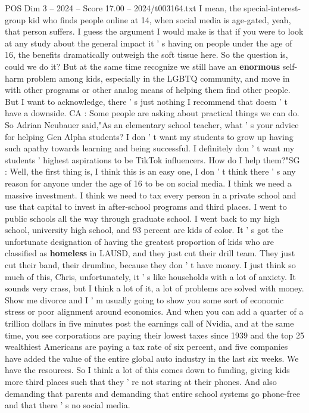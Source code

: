 \begin{textsample}{POS Dim 3 – 2024 – Score 17.00 – 2024/t003164.txt}
I mean, the special-interest-group kid who finds people online at 14, when social media is age-gated, yeah, that person suffers.
I guess the argument I would make is that if you were to look at any study about the general impact it ' s having on people under the age of 16, the benefits dramatically outweigh the soft tissue here.
So the question is, could we do it?
But at the same time recognize we still have an \textbf{enormous} self-harm problem among kids, especially in the LGBTQ community, and move in with other programs or other analog means of helping them find other people.
But I want to acknowledge, there ' s just nothing I recommend that doesn ' t have a downside.
CA : Some people are asking about practical things we can do.
So Adrian Neubauer said,"As an elementary school teacher, what ' s your advice for helping Gen Alpha students?
I don ' t want my students to grow up having such apathy towards learning and being successful.
I definitely don ' t want my students ' highest aspirations to be TikTok influencers.
How do I help them?"SG : Well, the first thing is, I think this is an easy one, I don ' t think there ' s any reason for anyone under the age of 16 to be on social media.
I think we need a massive investment.
I think we need to tax every person in a private school and use that capital to invest in after-school programs and third places.
I went to public schools all the way through graduate school.
I went back to my high school, university high school, and 93 percent are kids of color.
It ' s got the unfortunate designation of having the greatest proportion of kids who are classified as \textbf{homeless} in LAUSD, and they just cut their drill team.
They just cut their band, their drumline, because they don ' t have money.
I just think so much of this, Chris, unfortunately, it ' s like households with a lot of anxiety.
It sounds very crass, but I think a lot of it, a lot of problems are solved with money.
Show me divorce and I ' m usually going to show you some sort of economic stress or poor alignment around economics.
And when you can add a quarter of a trillion dollars in five minutes post the earnings call of Nvidia, and at the same time, you see corporations are paying their lowest taxes since 1939 and the top 25 wealthiest Americans are paying a tax rate of six percent, and five companies have added the value of the entire global auto industry in the last six weeks.
We have the resources.
So I think a lot of this comes down to funding, giving kids more third places such that they ' re not staring at their phones.
And also demanding that parents and demanding that entire school systems go phone-free and that there ' s no social media.

\end{textsample}

